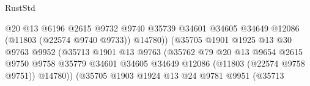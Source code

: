 \begin{lexlean}{RustStd}
\begin{coremodule}
                                                @20
                                                @13
                                                @6196
                                                @2615
                                                @9732
                                                @9740
                                                @35739
                                                @34601
                                                @34605
                                                @34649
                                                @12086
                                                (@11803 (@22574 @9740 @9733))
                                                @14780))
                                            (@35705
                                              @1901
                                              @1925
                                              @13
                                              @30
                                              @9763
                                              @9952
                                              (@35713
                                                @1901
                                                @13
                                                @9763
                                                (@35762
                                                  @79
                                                  @20
                                                  @13
                                                  @9654
                                                  @2615
                                                  @9750
                                                  @9758
                                                  @35779
                                                  @34601
                                                  @34605
                                                  @34649
                                                  @12086
                                                  (@11803 (@22574 @9758 @9751))
                                                  @14780))
                                              (@35705
                                                @1903
                                                @1924
                                                @13
                                                @24
                                                @9781
                                                @9951
                                                (@35713

\end{coremodule}
\end{lexlean}
